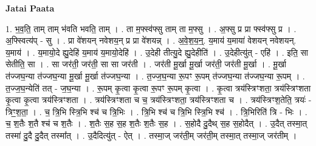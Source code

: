 \documentclass[17pt]{extarticle}
\begin{document}
\textbf{Jatai Paata} \newline

1. भ॒व॒ति॒ ताम् ताम् भ॑वति भवति॒ ताम् । . ता म॒फ्स्व॑फ्सु ताम् ता म॒फ्सु । . अ॒फ्सु प्र प्रा फ्स्व॑फ्सु प्र । . अ॒फ्स्वित्य॑प् - सु । . प्रा वे॑शयन् नवेशय॒न् प्र प्रा वे॑शयन्न् । . अ॒वे॒श॒य॒न्॒. य॒माय॑ य॒माया॑ वेशयन् नवेशयन्. य॒माय॑ । . य॒मायो॒दे ह्यु॒देहि॑ य॒माय॑ य॒मायो॒देहि॑ । . उ॒देही तीत्यु॒दे ह्यु॒देहीति॑ । . उ॒देहीत्यु॑त् - एहि॑ । . इति॒ सा सेतीति॒ सा । . सा जर॑ती॒ जर॑ती॒ सा सा जर॑ती । . जर॑ती मू॒र्खा मू॒र्खा जर॑ती॒ जर॑ती मू॒र्खा । . मू॒र्खा त॑ज्जघ॒न्या त॑ज्जघ॒न्या मू॒र्खा मू॒र्खा त॑ज्जघ॒न्या । . त॒ज्ज॒घ॒न्या रू॒पꣳ रू॒पम् त॑ज्जघ॒न्या त॑ज्जघ॒न्या रू॒पम् । . त॒ज्ज॒घ॒न्येति॑ तत् - ज॒घ॒न्या । . रू॒पम् कृ॒त्वा कृ॒त्वा रू॒पꣳ रू॒पम् कृ॒त्वा । . कृ॒त्वा त्रय॑स्त्रिꣳशता॒ त्रय॑स्त्रिꣳशता कृ॒त्वा कृ॒त्वा त्रय॑स्त्रिꣳशता । . त्रय॑स्त्रिꣳशता च च॒ त्रय॑स्त्रिꣳशता॒ त्रय॑स्त्रिꣳशता च । . त्रय॑स्त्रिꣳश॒तेति॒ त्रयः॑ - त्रिꣳ॒॒श॒ता॒ । . च॒ त्रि॒भि स्त्रि॒भि श्च॑ च त्रि॒भिः । . त्रि॒भि श्च॑ च त्रि॒भि स्त्रि॒भि श्च॑ । . त्रि॒भिरिति॑ त्रि - भिः । . च॒ श॒तैः श॒तै श्च॑ च श॒तैः । . श॒तैः स॒ह स॒ह श॒तैः श॒तैः स॒ह । . स॒होदै दु॒दैथ् स॒ह स॒होदैत् । . उ॒दैत् तस्मा॒त् तस्मा॑ दु॒दै दु॒दैत् तस्मा᳚त् । . उ॒दैदित्यु॑त् - ऐत् । . तस्मा॒ज् जर॑ती॒म् जर॑ती॒म् तस्मा॒त् तस्मा॒ज् जर॑तीम् । \newline
\end{document}
